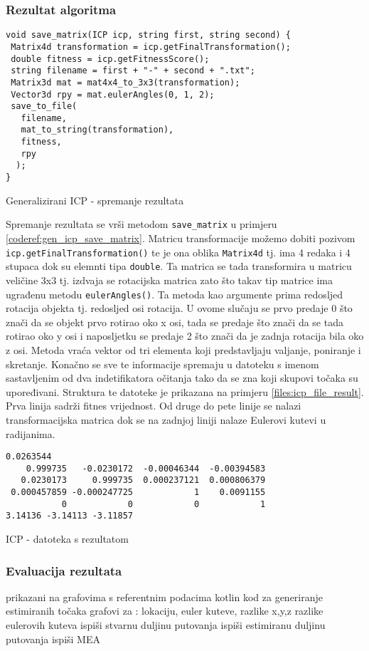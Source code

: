 \subsubsection{Rezultat algoritma}

\begin{listing}[h!]
  \begin{verbatim}
void save_matrix(ICP icp, string first, string second) {
 Matrix4d transformation = icp.getFinalTransformation();
 double fitness = icp.getFitnessScore();
 string filename = first + "-" + second + ".txt";
 Matrix3d mat = mat4x4_to_3x3(transformation);
 Vector3d rpy = mat.eulerAngles(0, 1, 2);
 save_to_file(
   filename,
   mat_to_string(transformation),
   fitness,
   rpy
  );
}
  \end{verbatim}
  \caption{Generalizirani ICP - spremanje rezultata}
  \label{coderef:gen_icp_save_matrix}
\end{listing}

Spremanje rezultata se vrši metodom \texttt{save_matrix} u primjeru \ref{coderef:gen_icp_save_matrix}. Matricu transformacije možemo dobiti pozivom \texttt{icp.getFinalTransformation()} te je ona oblika \texttt{Matrix4d} tj. ima 4 redaka i 4 stupaca dok su elemnti tipa \texttt{double}. Ta matrica se tada transformira u matricu veličine 3x3 tj. izdvaja se rotacijska matrica zato što takav tip matrice ima ugrađenu metodu \texttt{eulerAngles()}. Ta metoda kao argumente prima redosljed rotacija objekta tj. redosljed osi rotacija. U ovome slučaju se prvo predaje 0 što znači da se objekt prvo rotirao oko x osi, tada se predaje što znači da se tada rotirao oko y osi i naposljetku se predaje 2 što znači da je zadnja rotacija bila oko z osi. Metoda vraća vektor od tri elementa koji predstavljaju valjanje, poniranje i skretanje. Konačno se sve te informacije spremaju u datoteku s imenom sastavljenim od dva indetifikatora očitanja tako da se zna koji skupovi točaka su upoređivani. Struktura te datoteke je prikazana na primjeru  \ref{files:icp_file_result}. Prva linija sadrži fitnes vrijednost. Od druge do pete linije se nalazi transformacijska matrica dok se na zadnjoj liniji nalaze Eulerovi kutevi u radijanima.
\begin{listing}[h!]
  \begin{verbatim}
0.0263544
    0.999735   -0.0230172  -0.00046344  -0.00394583
   0.0230173     0.999735  0.000237121  0.000806379
 0.000457859 -0.000247725            1    0.0091155
           0            0            0            1
3.14136 -3.14113 -3.11857
  \end{verbatim}
  \caption{ICP - datoteka s rezultatom}
  \label{files:icp_file_result}
\end{listing}

\subsubsection{Evaluacija rezultata}



prikazani na grafovima s referentnim podacima
kotlin kod za generiranje estimiranih točaka
grafovi za :
  lokaciju,
  euler kuteve,
  razlike x,y,z
  razlike eulerovih kuteva
ispiši stvarnu duljinu putovanja
ispiši estimiranu duljinu putovanja
ispiši MEA